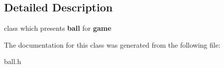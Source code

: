 \subsection{Detailed Description}
class which presents {\bfseries{ball}} for {\bfseries{game}} 

The documentation for this class was generated from the following file\+:\begin{DoxyCompactItemize}
\item 
ball.\+h\end{DoxyCompactItemize}
